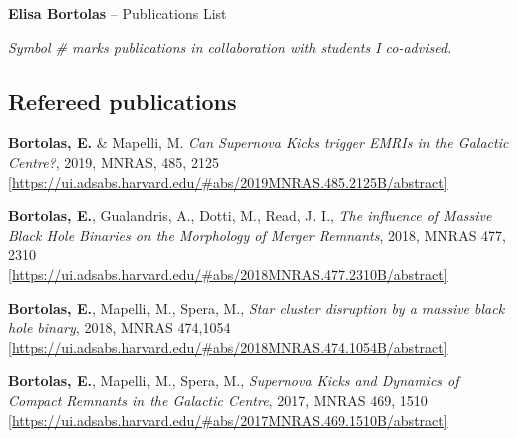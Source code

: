 \documentclass[11pt,a4paper]{article}
\begin{document}
\thispagestyle{empty}
\begin{center}
\begin{Large}
{\color{color} {\bf Elisa Bortolas} }-- {Publications List}
\end{Large}

\vspace{-0pt}

\end{center}


\textit{Symbol \# marks publications in collaboration with students I co-advised.}

\subsection*{ Refereed publications}

\begin{etaremune}

\item {\bf Bortolas, E.} \& Mapelli, M. { \it Can Supernova Kicks trigger EMRIs in the Galactic Centre?}, 2019, MNRAS, 485, 2125 \\ \href{https://ui.adsabs.harvard.edu/#abs/2019MNRAS.485.2125B/abstract}{\scriptsize [https://ui.adsabs.harvard.edu/\#abs/2019MNRAS.485.2125B/abstract]}

\item {\bf Bortolas, E.}, Gualandris, A., Dotti, M., Read, J. I., { \it The influence of Massive Black Hole Binaries on the Morphology of Merger Remnants},  2018, MNRAS 477, 2310 \\ \href{https://ui.adsabs.harvard.edu/#abs/2018MNRAS.477.2310B/abstract}{\scriptsize [https://ui.adsabs.harvard.edu/\#abs/2018MNRAS.477.2310B/abstract]}

\item {\bf Bortolas, E.}, Mapelli, M., Spera, M., { \it Star cluster disruption by a massive black hole binary}, 2018, MNRAS 474,1054 \\ \href{https://ui.adsabs.harvard.edu/#abs/2018MNRAS.474.1054B/abstract}{\scriptsize [https://ui.adsabs.harvard.edu/\#abs/2018MNRAS.474.1054B/abstract]}

\item {\bf Bortolas, E.}, Mapelli, M., Spera, M., {\it Supernova Kicks and Dynamics of Compact Remnants in the Galactic Centre}, 2017, MNRAS 469, 1510 \\ \href{https://ui.adsabs.harvard.edu/#abs/2017MNRAS.469.1510B/abstract}{\scriptsize [https://ui.adsabs.harvard.edu/#abs/2017MNRAS.469.1510B/abstract]} 


\end{etaremune}
\end{document}
